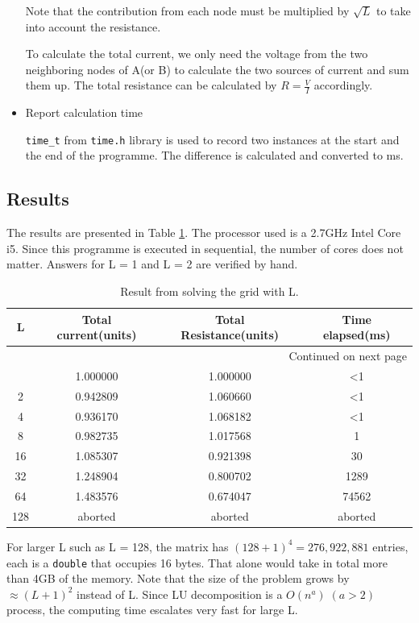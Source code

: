 \documentclass{article}
\begin{document}
\begin{itemize}
Note that the contribution from each node must be multiplied by
$\sqrt{L}$ to take into account the resistance.

To calculate the total current, we only need the voltage from the
two neighboring nodes of A(or B) to calculate the two sources of
current and sum them up. The total resistance can be calculated by
$R = \frac{V}{I}$ accordingly.

\item Report calculation time

\texttt{time\_t} from \texttt{time.h} library is used to record two instances at the
start and the end of the programme. The difference is calculated and
converted to ms.
\end{itemize}


\subsection{Results}
\label{sec-2-2}

The results are presented in Table \ref{tbl:grid}. The processor
used is a 2.7GHz Intel Core i5. Since this programme is executed in
sequential, the number of cores does not matter. Answers for L = 1
and L = 2 are verified by hand.

\begin{longtable}{|c|c|c|c|}
\caption{\label{tbl:grid}Result from solving the grid with L.}
\\
\hline
L & Total current(units) & Total Resistance(units) & Time elapsed(ms)\\
\hline
\endhead
\hline\multicolumn{4}{r}{Continued on next page} \\
\endfoot
\endlastfoot
1 & 1.000000 & 1.000000 & <1\\
2 & 0.942809 & 1.060660 & <1\\
4 & 0.936170 & 1.068182 & <1\\
8 & 0.982735 & 1.017568 & 1\\
16 & 1.085307 & 0.921398 & 30\\
32 & 1.248904 & 0.800702 & 1289\\
64 & 1.483576 & 0.674047 & 74562\\
128 & aborted & aborted & aborted\\
\hline
\end{longtable}



For larger L such as L = 128, the matrix has $(128+1)^4 =
   276,922,881$ entries, each is a \texttt{double} that occupies 16 bytes. That
alone would take in total more than 4GB of the memory. Note that
the size of the problem grows by $\approx (L+1)^2$ instead of
L. Since LU decomposition is a $\textit{O}(n^a) \; (a>2)$ process, the
computing time escalates very fast for large L.
\end{document}
